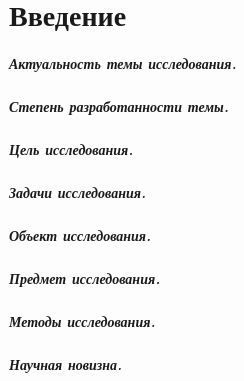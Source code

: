 \chapter*{Введение}

\renewcommand{\chaptername}{Глава}
\renewcommand{\appendixname}{Приложение}
\renewcommand{\listfigurename}{Список рисунков}
\renewcommand{\listtablename}{Список таблиц}
\renewcommand{\bibname}{Список литературы}

\paragraph*{Актуальность темы исследования.}

\paragraph*{Степень разработанности темы.}

\paragraph*{Цель исследования.}

\paragraph*{Задачи исследования.}

\paragraph*{Объект исследования.}

\paragraph*{Предмет исследования.}

\paragraph*{Методы исследования.}

\paragraph*{Научная новизна.}

